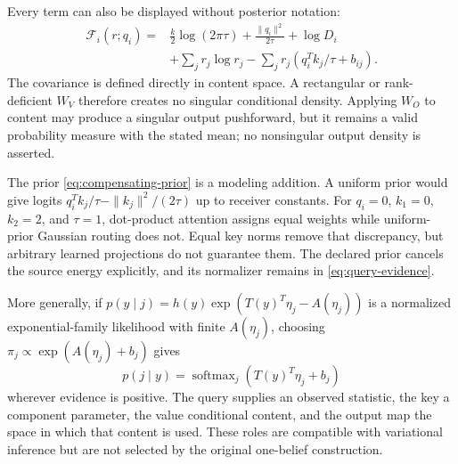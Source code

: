\documentclass[11pt]{article}
\newcommand{\softmax}{\operatorname{softmax}}
\begin{document}
Every term can also be displayed without posterior notation:
\begin{align}
\mathcal F_i(r;q_i)={}&\frac{k}{2}\log(2\pi\tau)+\frac{\|q_i\|^2}{2\tau}+\log D_i\nonumber\\
&+\sum_jr_j\log r_j-\sum_jr_j(q_i^Tk_j/\tau+b_{ij}).
\label{eq:expanded-elbo}
\end{align}
The covariance is defined directly in content space. A rectangular or rank-deficient $W_V$ therefore creates no singular conditional density. Applying $W_O$ to content may produce a singular output pushforward, but it remains a valid probability measure with the stated mean; no nonsingular output density is asserted.

The prior \eqref{eq:compensating-prior} is a modeling addition. A uniform prior would give logits $q_i^Tk_j/\tau-\|k_j\|^2/(2\tau)$ up to receiver constants. For $q_i=0$, $k_1=0$, $k_2=2$, and $\tau=1$, dot-product attention assigns equal weights while uniform-prior Gaussian routing does not. Equal key norms remove that discrepancy, but arbitrary learned projections do not guarantee them. The declared prior cancels the source energy explicitly, and its normalizer remains in \eqref{eq:query-evidence}.

More generally, if $p(y\mid j)=h(y)\exp(T(y)^T\eta_j-A(\eta_j))$ is a normalized exponential-family likelihood with finite $A(\eta_j)$, choosing $\pi_j\propto\exp(A(\eta_j)+b_j)$ gives
\begin{equation}
p(j\mid y)=\softmax_j(T(y)^T\eta_j+b_j)
\label{eq:exponential-routing}
\end{equation}
wherever evidence is positive. The query supplies an observed statistic, the key a component parameter, the value conditional content, and the output map the space in which that content is used. These roles are compatible with variational inference but are not selected by the original one-belief construction.
\end{document}
